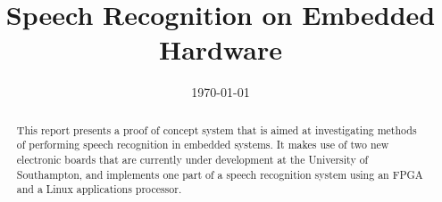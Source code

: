\documentclass{ecsreport}     			%
\begin{document}
\frontmatter
\title      {Speech Recognition on Embedded Hardware}
\addresses  {\groupname\\\deptname\\\univname}
\date       {\today}
\subject    {}
\keywords   {}
\maketitle
\begin{abstract}  %
This report presents a proof of concept system that is aimed at investigating methods of performing speech recognition in embedded systems.  It makes use of two new electronic boards that are currently under development at the University of Southampton, and implements one part of a speech recognition system using an FPGA and a Linux applications processor.
\end{abstract}
\tableofcontents
\mainmatter



\backmatter

\end{document}
